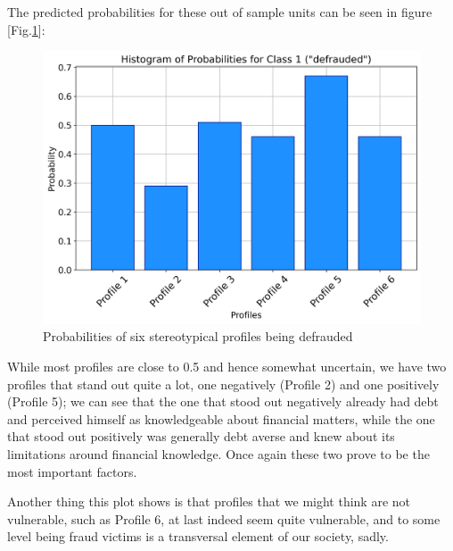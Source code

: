 \documentclass[a4paper,11pt]{article}
\begin{document}
The predicted probabilities for these out of sample units can be seen in figure [Fig.\ref{profile}]:
\begin{figure}[H]
  \centering
        \includegraphics[width=12cm]{ProfileProbs.png}
 \caption{Probabilities of six stereotypical profiles being defrauded}
 \label{profile}
\end{figure}

While most profiles are close to 0.5 and hence somewhat uncertain, we have two profiles that stand out quite a lot, one negatively (Profile 2) and one positively (Profile 5); we can see that the one that stood out negatively already had debt and perceived himself as knowledgeable about financial matters, while the one that stood out positively was generally debt averse and knew about its limitations around financial knowledge. Once again these two prove to be the most important factors. 

Another thing this plot shows is that profiles that we might think are not vulnerable, such as Profile 6, at last indeed seem quite vulnerable, and to some level being fraud victims is a transversal element of our society, sadly.
\end{document}
